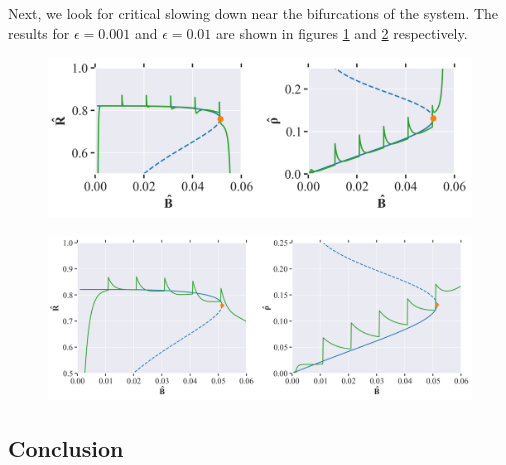 Next, we look for critical slowing down near the bifurcations of the system. The results for $\epsilon = 0.001$ and $\epsilon = 0.01$ are shown in figures \ref{fig:cell_biology_critical_slowing_down_small} and \ref{fig:cell_biology_critical_slowing_down_big} respectively.
\begin{figure}[H]
    \centering
    \includegraphics[width= \textwidth]{figures/cell_biology_critslow_R(0)=0.0_rho(0)=0.0_B(0)_0.001_eps=0.001_Bmax=0.04.png}
    \caption{}
    \label{fig:cell_biology_critical_slowing_down_small}
\end{figure}

\begin{figure}[H]
    \centering
    \includegraphics[width= \textwidth]{figures/cell_biology_critslow_R(0)=0.0_rho(0)=0.0_B(0)_0.001_eps=0.01_Bmax=0.04.png}
    \caption{}
    \label{fig:cell_biology_critical_slowing_down_big}
\end{figure}

\subsection{Conclusion}
